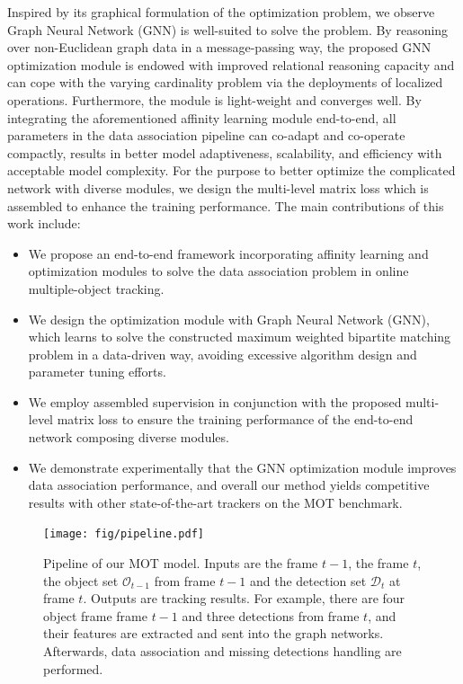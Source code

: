 \documentclass[10pt,twocolumn,letterpaper]{article}
\begin{document}
Inspired by its graphical formulation of the optimization problem, we observe Graph Neural Network (GNN) \cite{TheGNNModel} is well-suited to solve the problem. By reasoning over non-Euclidean graph data in a message-passing way, the proposed GNN optimization module is endowed with improved relational reasoning capacity and can cope with the varying cardinality problem via the deployments of localized operations. Furthermore, the module is light-weight and converges well. By integrating the aforementioned affinity learning module end-to-end, all parameters in the data association pipeline can co-adapt and co-operate compactly, results in better model adaptiveness, scalability, and efficiency with acceptable model complexity. For the purpose to better optimize the complicated network with diverse modules, we design the multi-level matrix loss which is assembled to enhance the training performance. The main contributions of this work include:
\begin{itemize}
\item We propose an end-to-end framework incorporating affinity learning and optimization modules to solve the data association problem in online multiple-object tracking.
\item We design the optimization module with Graph Neural Network (GNN), which learns to solve the constructed maximum weighted bipartite matching problem in a data-driven way, avoiding excessive algorithm design and parameter tuning efforts.
\item We employ assembled supervision in conjunction with the proposed multi-level matrix loss to ensure the training performance of the end-to-end network composing diverse modules.
\item We demonstrate experimentally that the GNN optimization module improves data association performance, and overall our method yields competitive results with other state-of-the-art trackers on the MOT benchmark.
\end{itemize}

\begin{figure}[ht]
\centering
\texttt{[image: fig/pipeline.pdf]}
\caption{Pipeline of our MOT model.
	Inputs are the frame $t-1$, the frame $t$, the object set $\mathcal{O}_{t-1}$ from frame $t-1$ and the detection set $\mathcal{D}_t$ at frame $t$.
	Outputs are tracking results.
	For example, there are four object frame frame $t-1$ and three detections from frame $t$, 
	and their features are extracted and sent into the graph networks.
	Afterwards, data association and missing detections handling are performed.}
\label{fig:pipeline}
\end{figure}
\end{document}
